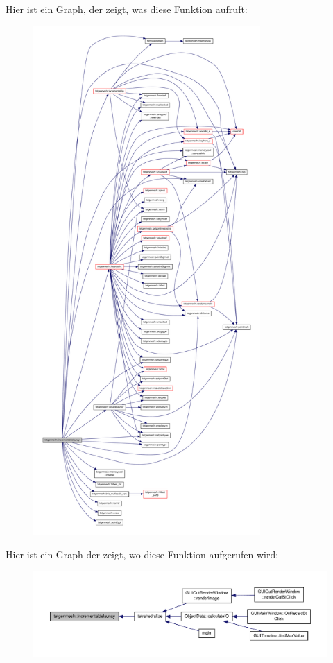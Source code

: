 Hier ist ein Graph, der zeigt, was diese Funktion aufruft\-:\nopagebreak
\begin{figure}[H]
\begin{center}
\leavevmode
\includegraphics[height=550pt]{classtetgenmesh_a5a5a0513d0bea7aa457eb0bc5fad1b02_cgraph}
\end{center}
\end{figure}




Hier ist ein Graph der zeigt, wo diese Funktion aufgerufen wird\-:\nopagebreak
\begin{figure}[H]
\begin{center}
\leavevmode
\includegraphics[width=350pt]{classtetgenmesh_a5a5a0513d0bea7aa457eb0bc5fad1b02_icgraph}
\end{center}
\end{figure}


